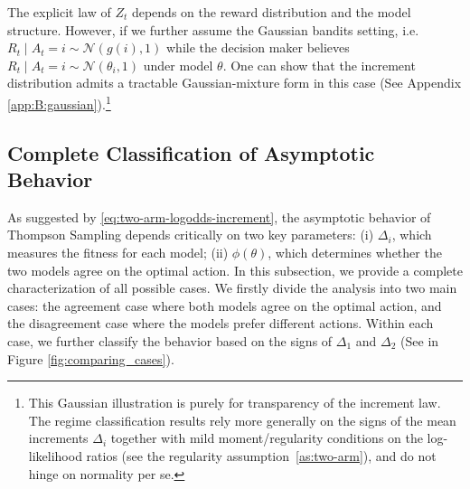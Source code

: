 \documentclass[12pt]{article}
\begin{document}
The explicit law of $Z_t$ depends on the reward distribution and the model structure. However, if we further assume the Gaussian bandits setting, i.e. $R_t \mid A_t = i \sim \mathcal{N}(g(i), 1)$ while the decision maker believes $R_t \mid A_t = i \sim \mathcal{N}(\theta_i, 1)$ under model $\theta$. One can show that the increment distribution admits a tractable Gaussian-mixture form in this case (See Appendix \ref{app:B:gaussian}).\footnote{This Gaussian illustration is purely for transparency of the increment law. The regime classification results rely more generally on the signs of the mean increments $\Delta_i$ together with mild moment/regularity conditions on the log-likelihood ratios (see the regularity assumption~\ref{as:two-arm}), and do not hinge on normality per se.}


\subsection{Complete Classification of Asymptotic Behavior}
\label{sec:two_arm_dynamics}
As suggested by \eqref{eq:two-arm-logodds-increment}, the asymptotic behavior of Thompson Sampling depends critically on two key parameters: (i) $\Delta_{i}$, which measures the fitness for each model; (ii) $\phi(\theta)$, which determines whether the two models agree on the optimal action. In this subsection, we provide a complete characterization of all possible cases. We firstly divide the analysis into two main cases: the agreement case where both models agree on the optimal action, and the disagreement case where the models prefer different actions. Within each case, we further classify the behavior based on the signs of $\Delta_1$ and $\Delta_2$ (See in Figure \ref{fig:comparing_cases}).
\end{document}
